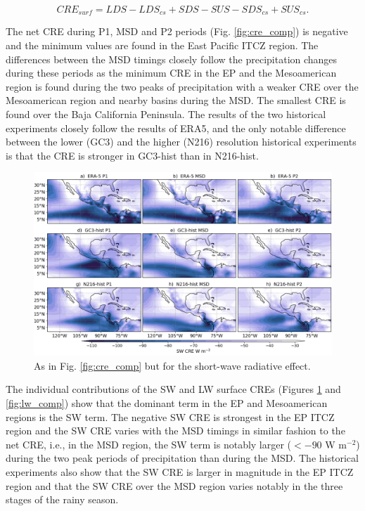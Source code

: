 \begin{equation}
CRE_{surf}=  LDS-LDS_{cs}+SDS-SUS-SDS_{cs}+SUS_{cs}.
\end{equation}



The net CRE during P1, MSD and P2 periods (Fig. \ref{fig:cre_comp}) is negative  and the minimum values are found in the East Pacific ITCZ region. The differences between the MSD timings closely follow the precipitation changes during these periods as the minimum CRE in the EP and the Mesoamerican region is found during the two peaks of precipitation with a weaker CRE over the Mesoamerican region and nearby basins during the MSD. The smallest CRE is found over the Baja California Peninsula. 
The results of the two historical experiments closely follow the results of ERA5, and the only notable difference between the lower (GC3) and the higher (N216) resolution historical experiments is that the CRE is stronger in GC3-hist than in N216-hist.

\begin{figure}[t!]
\includegraphics[width=\linewidth]{figures/fig4_swclim_3.png}
\caption[Short-wave cloud radiative effect composites]{As in Fig. \ref{fig:cre_comp} but for the short-wave radiative effect.}
\label{fig:sw_comp}
\end{figure}

The individual contributions of the SW and LW surface CREs (Figures \ref{fig:sw_comp} and \ref{fig:lw_comp}) show that the dominant term in the EP and Mesoamerican regions is the SW term. The negative SW CRE is strongest in the EP ITCZ region and the SW CRE varies with the MSD timings in similar fashion to the net CRE, i.e., in the MSD region, the SW term is notably larger ($<-90$ W m$^{-2}$) during the two peak periods of precipitation than during the MSD.
The historical experiments also show that the SW CRE is larger in magnitude in the EP ITCZ region and that the SW CRE over the MSD region varies notably in the three stages of the rainy season.

